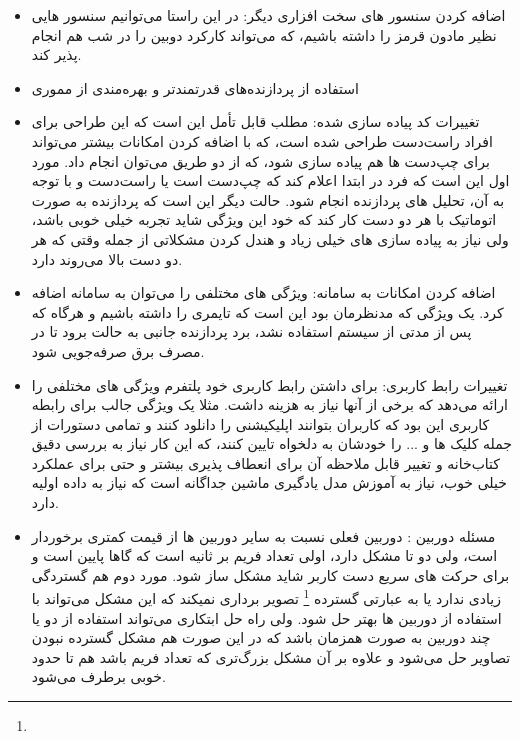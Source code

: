 \documentclass{article}
\begin{document}
\begin{itemize}
	\item اضافه کردن سنسور های سخت افزاری دیگر: در این راستا می‌توانیم سنسور هایی نظیر مادون قرمز را داشته باشیم، که می‌تواند کارکرد دوبین را در شب هم انجام پذیر کند.
	
	\item استفاده از پردازنده‌های قدرتمند‌تر و بهره‌مندی از مموری 
	
	\item تغییرات کد پیاده سازی شده: مطلب قابل تأمل این است که این طراحی برای افراد راست‌دست طراحی شده است، که با اضافه کردن امکانات بیشتر می‌تواند برای چپ‌دست ها هم پیاده سازی شود، که از دو طریق می‌توان انجام داد. مورد اول این است که فرد در ابتدا اعلام کند که چپ‌دست است یا راست‌دست و با توجه به آن، تحلیل های پردازنده انجام شود. حالت دیگر این است که پردازنده به صورت اتوماتیک با هر دو دست کار کند که خود این ویژگی شاید تجربه خیلی خوبی باشد، ولی نیاز به پیاده سازی های خیلی زیاد و هندل کردن مشکلاتی از جمله وقتی که هر دو دست بالا می‌روند دارد.
	
	\item اضافه کردن امکانات به سامانه: ویژگی های مختلفی را می‌توان به سامانه اضافه کرد. یک ويژگی که مدنظرمان بود این است که تایمری را داشته باشیم و هرگاه که پس از مدتی از سیستم استفاده نشد، برد پردازنده جانبی به حالت  برود تا در مصرف برق صرفه‌جویی شود.
	
	\item تغییرات رابط کاربری: برای داشتن رابط کاربری خود پلتفرم ویژگی های مختلفی را ارائه می‌دهد که برخی از آنها نیاز به هزینه داشت. مثلا یک ويژگی جالب برای رابطه کاربری این بود که کاربران بتوانند اپلیکیشنی را دانلود کنند و تمامی دستورات از جمله کلیک ها و ... را خودشان به دلخواه تایین کنند، که این کار نیاز به بررسی دقیق کتاب‌خانه  و تغییر قابل ملاحظه آن برای انعطاف پذیری بیشتر و حتی برای عملکرد خیلی خوب، نیاز به آموزش مدل یادگیری ماشین جداگانه است که نیاز به داده اولیه دارد.
	
	\item مسئله دوربین : دوربین فعلی نسبت به سایر دوربین ها از قیمت کمتری برخوردار است، ولی دو تا مشکل دارد، اولی تعداد فریم بر ثانیه است که گاها پایین است و برای حرکت های سریع دست کاربر شاید مشکل ساز شود. مورد دوم هم گستردگی زیادی ندارد یا به عبارتی گسترده \footnote{} تصویر برداری نمیکند که این مشکل می‌تواند با استفاده از دوربین ها بهتر حل شود. ولی راه حل ابتکاری می‌تواند استفاده از دو یا چند دوربین به صورت همزمان باشد که در این صورت هم مشکل گسترده نبودن تصاویر حل می‌شود و علاوه بر آن مشکل بزرگ‌تری که تعداد فریم باشد هم تا حدود خوبی برطرف می‌شود.
\end{itemize}
\end{document}
